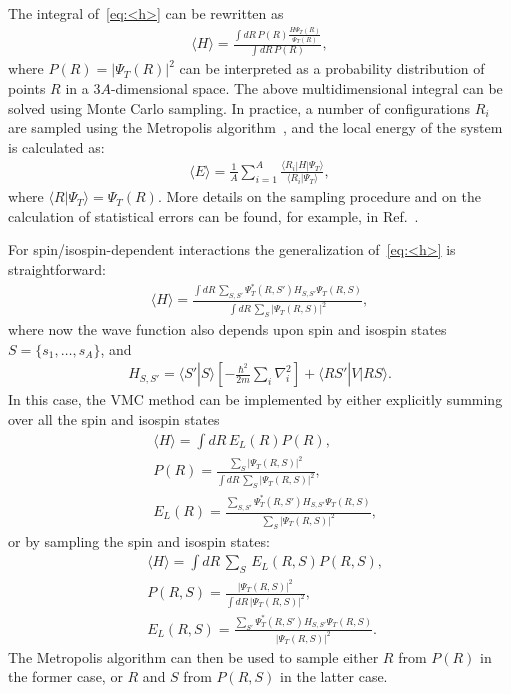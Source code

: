 \documentclass[aps,prc,twocolumn,superscriptaddress,floatfix]{revtex4-1}
\begin{document}
The integral of~\cref{eq:<h>} can be rewritten as
\begin{align}
\langle H\rangle=\frac{\displaystyle\int dR\,P(R) \frac{H\Psi_T(R)}{\Psi_T(R)}}{\displaystyle\int dR\,P(R)} ,
\end{align}
where $P(R)=|\Psi_T(R)|^2$ can be interpreted as a probability distribution of points $R$ in a $3A$-dimensional space.
The above multidimensional integral can be solved using Monte Carlo sampling.
In practice, a number of configurations $R_i$ are sampled using the Metropolis algorithm~\cite{Metropolis:1953}, 
and the local energy of the system is calculated as:
\begin{align}
\langle E\rangle=\frac{1}{A}\sum_{i=1}^A \frac{\langle R_i|H|\Psi_T\rangle}{\langle R_i|\Psi_T\rangle} ,
\end{align}
where $\langle R|\Psi_T\rangle=\Psi_T(R)$.
More details on the sampling procedure and on the calculation of statistical errors can be found, 
for example, in Ref.~\cite{Ceperley:1995}.

For spin/isospin-dependent interactions the generalization of~\cref{eq:<h>} is straightforward:
\begin{align}
\langle H\rangle=\frac{\displaystyle\int dR\,\sum_{S,S'}\Psi_T^*(R,S')H_{S,S'}\Psi_T(R,S)}
{\displaystyle\int dR\,\sum_S|\Psi_T(R,S)|^2} ,
\end{align}
where now the wave function also depends upon spin and isospin states $S=\{s_1,\dots,s_A\}$, and
\begin{align}
H_{S,S'}=\langle S'|S\rangle\left[-\frac{\hbar^2}{2m}\sum_i\nabla_i^2\right]+\langle RS'|V|RS\rangle .
\end{align}
In this case, the VMC method can be implemented by either explicitly summing over all the spin and isospin states
\begin{align}
&\langle H\rangle=\displaystyle\int dR\,E_L(R)P(R) ,\nonumber \\
&P(R)=\frac{\sum_S|\Psi_T(R,S)|^2}{\displaystyle\int dR\,\sum_S|\Psi_T(R,S)|^2} ,\nonumber \\
&E_L(R)=\frac{\sum_{S,S'}\Psi_T^*(R,S')H_{S,S'}\Psi_T(R,S)}{\sum_S|\Psi_T(R,S)|^2} ,
\end{align}
or by sampling the spin and isospin states:
\begin{align}
&\langle H\rangle=\displaystyle\int dR\,\sum_S\,E_L(R,S)P(R,S) ,\nonumber \\
&P(R,S)=\frac{|\Psi_T(R,S)|^2}{\displaystyle\int dR\,|\Psi_T(R,S)|^2} ,\nonumber \\
&E_L(R,S)=\frac{\sum_{S'}\Psi_T^*(R,S')H_{S,S'}\Psi_T(R,S)}{|\Psi_T(R,S)|^2} .
\end{align}
The Metropolis algorithm can then be used to sample either $R$ from $P(R)$ in the former case, 
or $R$ and $S$ from $P(R,S)$ in the latter case.
\end{document}
